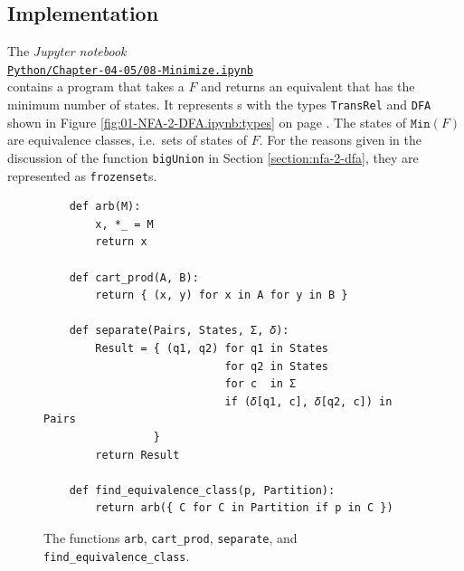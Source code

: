 \subsection{Implementation}
The \textsl{Jupyter notebook} 
\\[0.2cm]
\hspace*{1.3cm}
\href{https://github.com/karlstroetmann/Formal-Languages/blob/master/Python/Chapter-04-05/08-Minimize.ipynb}{\texttt{Python/Chapter-04-05/08-Minimize.ipynb}}
\\[0.2cm]
contains a program that takes a   $F$ and returns an equivalent  that has
the minimum number of states.  It represents s with the types \texttt{TransRel} and \texttt{DFA} shown
in Figure \ref{fig:01-NFA-2-DFA.ipynb:types} on page \pageref{fig:01-NFA-2-DFA.ipynb:types}.  The states of
$\texttt{Min}(F)$ are equivalence classes, i.e.~sets of states of $F$.  For the reasons given in the discussion of
the function \texttt{bigUnion} in Section \ref{section:nfa-2-dfa}, they are represented as \texttt{frozenset}s.

\begin{figure}[!ht]
\centering
\begin{verbatim}
    def arb(M):
        x, *_ = M
        return x

    def cart_prod(A, B):
        return { (x, y) for x in A for y in B }

    def separate(Pairs, States, Σ, 𝛿):
        Result = { (q1, q2) for q1 in States
                            for q2 in States
                            for c  in Σ
                            if (𝛿[q1, c], 𝛿[q2, c]) in Pairs
                 }
        return Result

    def find_equivalence_class(p, Partition):
        return arb({ C for C in Partition if p in C })
\end{verbatim}
\vspace*{-0.3cm}
\caption{The functions \texttt{arb}, \texttt{cart\_prod}, \texttt{separate}, and \texttt{find\_equivalence\_class}.}
\label{fig:08-Minimize.ipynb:separate}
\end{figure}

